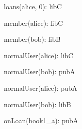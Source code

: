 \documentclass{article}
\begin{document}
{\begin{minipage}{\tableWidth}
\begin{description}[align=left,leftmargin=1em,noitemsep,labelsep=\parindent]
\item{{loans(\allowbreak{}alice, 0): libC}}
\item{{member(\allowbreak{}alice): libC}}
\item{{member(\allowbreak{}bob): libB}}
\item{{normalUser(\allowbreak{}alice): libC}}
\item{{normalUser(\allowbreak{}bob): pubA}}
\item{{normalUser(\allowbreak{}alice): pubA}}
\item{{normalUser(\allowbreak{}bob): libB}}
\item{{onLoan(\allowbreak{}book1\_a): pubA}}
\end{description}\end{minipage}}
\end{document}
